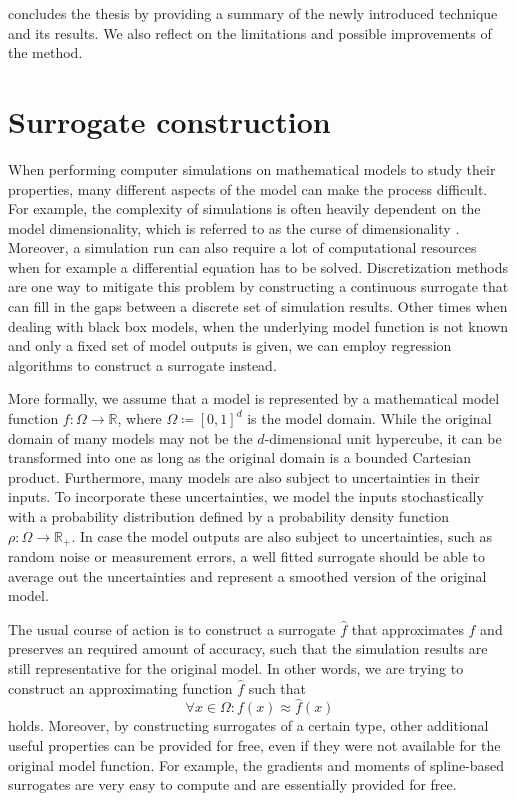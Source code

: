\documentclass[
  a4paper,  %
  twoside,  %
  bibliography=totoc,
  headsepline,
  cleardoublepage=empty,
  parskip=half,
  draft=false
]{scrbook}
\begin{document}
 concludes the thesis by providing a summary of the newly introduced technique and its results.
We also reflect on the limitations and possible improvements of the method.

\chapter{Surrogate construction}
\label{chap:c2}

When performing computer simulations on mathematical models to study their properties, many different aspects of the model can make the process difficult.
For example, the complexity of simulations is often heavily dependent on the model dimensionality, which is referred to as the curse of dimensionality \cite{Bellman1961}.
Moreover, a simulation run can also require a lot of computational resources when for example a differential equation has to be solved.
Discretization methods are one way to mitigate this problem by constructing a continuous surrogate that can fill in the gaps between a discrete set of simulation results.
Other times when dealing with black box models, \ie when the underlying model function is not known and only a fixed set of model outputs is given, we can employ regression algorithms to construct a surrogate instead.

More formally, we assume that a model is represented by a mathematical model function $f \colon \Omega \to \mathds{R}$, where $\Omega \coloneqq [0,1]^d$ is the model domain.
While the original domain of many models may not be the $d$-dimensional unit hypercube, it can be transformed into one as long as the original domain is a bounded Cartesian product.
Furthermore, many models are also subject to uncertainties in their inputs.
To incorporate these uncertainties, we model the inputs stochastically with a probability distribution defined by a probability density function $\rho \colon \Omega \to \mathds{R_+}$.
In case the model outputs are also subject to uncertainties, such as random noise or measurement errors, a well fitted surrogate should be able to average out the uncertainties and represent a smoothed version of the original model.

The usual course of action is to construct a surrogate $\hat{f}$ that approximates $f$ and preserves an required amount of accuracy, such that the simulation results are still representative for the original model.
In other words, we are trying to construct an approximating function $\hat{f}$ such that
\begin{equation}
\forall x \in \Omega \colon f(x) \approx \hat{f}(x)
\end{equation}
holds.
Moreover, by constructing surrogates of a certain type, other additional useful properties can be provided for free, even if they were not available for the original model function.
For example, the gradients and moments of spline-based surrogates are very easy to compute and are essentially provided for free.
\end{document}
